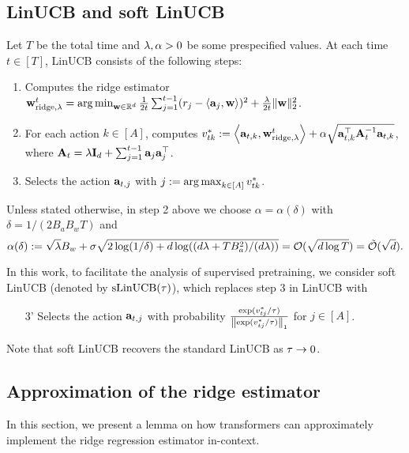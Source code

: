 \subsection{LinUCB and soft LinUCB}\label{sec:soft-LinUCB}
Let $T$ be the total time and $\lambda,{\alpha}>0$ be some prespecified values. At each time $t\in[T]$, LinUCB consists of the following steps:
\begin{enumerate}
    \item Computes the ridge estimator ${\mathbf w}^t_{{\rm ridge},\lambda}=\operatorname*{arg\,min}_{{\mathbf w}\in\mathbb{R}^d}\frac{1}{2t}\sum_{j=1}^{t-1}(r_j-\left\langle{\mathbf a}_j,{\mathbf w}\right\rangle)^2+\frac{\lambda}{2t}\|{\mathbf w}\|_2^2$.
    \item For each action $k\in[A]$, computes $v^*_{tk}:=\left\langle{\mathbf a}_{t,k},{\mathbf w}^t_{{\rm ridge},\lambda}\right\rangle+{\alpha}\sqrt{{\mathbf a}_{t,k}^\top {\mathbf A}_{t}^{-1}  {\mathbf a}_{t,k}}$, where ${\mathbf A}_t=\lambda{\mathbf I}_d+\sum_{j=1}^{t-1}{\mathbf a}_j{\mathbf a}_j^\top$.
    \item Selects the action ${\mathbf a}_{t,j}$ with $j:=\operatorname*{arg\,max}_{k\in[A]}v^*_{tk}$.
\end{enumerate}
Unless stated otherwise, in step 2 above we choose $\alpha=\alpha(\delta)$ with $\delta=1/(2B_aB_wT)$ and $${\alpha}(\delta):=\sqrt{\lambda}B_w+\sigma\sqrt{2\log(1/\delta)+d\log((d\lambda+TB_a^2)/(d\lambda))}=\mathcal{O}(\sqrt{d\log {T}})={\tilde{\mathcal O}}(\sqrt{d}).$$


In this work, to facilitate the analysis of supervised pretraining, we consider soft LinUCB (denoted by ${\mathrm{sLinUCB}}({\tau})$), which replaces step 3 in LinUCB with
\begin{enumerate}
    \item [3'] Selects the action ${\mathbf a}_{t,j}$ with probability $\frac{\exp(v^*_{tj}/{\tau})}{\left\|{\exp(v^*_{tj}/{\tau})}\right\|_1}$ for $j\in[A]$.
\end{enumerate} Note that soft LinUCB recovers the standard LinUCB as ${\tau}\to0$.











\subsection{Approximation of the ridge estimator}\label{app:approx-ridge-estimator}
In this section, we present a lemma on how transformers can  approximately implement the ridge regression estimator in-context.






